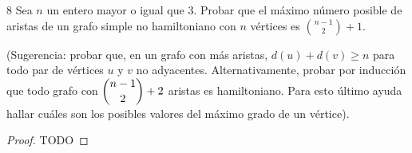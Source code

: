 \vspace{0.5cm}

\begin{ejercicio}{8}
    Sea \(n\) un entero mayor o igual que 3. Probar que el máximo número posible de aristas de un grafo simple no hamiltoniano con \(n\) vértices es \(\binom{n-1}{2} + 1\).

    (Sugerencia: probar que, en un grafo con más aristas, \( d(u) + d(v) \geq n \) para todo par de vértices \( u \) y \( v \) no adyacentes. Alternativamente, probar por inducción que todo grafo con \( \dbinom{n-1}{2} + 2 \) aristas es hamiltoniano. Para esto último ayuda hallar cuáles son los posibles valores del máximo grado de un vértice).
\end{ejercicio}
\begin{proof}
    TODO
\end{proof}
